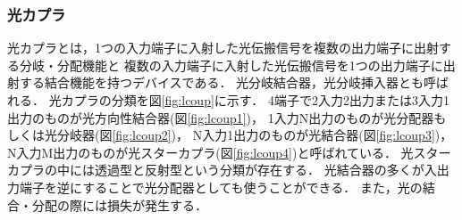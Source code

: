 \subsubsection{光カプラ}
光カプラとは，1つの入力端子に入射した光伝搬信号を複数の出力端子に出射する分岐・分配機能と
複数の入力端子に入射した光伝搬信号を1つの出力端子に出射する結合機能を持つデバイスである．
光分岐結合器，光分岐挿入器とも呼ばれる．
光カプラの分類を図\ref{fig:lcoup}に示す．
4端子で2入力2出力または3入力1出力のものが光方向性結合器(図\ref{fig:lcoup1})，
1入力N出力のものが光分配器もしくは光分岐器(図\ref{fig:lcoup2})，
N入力1出力のものが光結合器(図\ref{fig:lcoup3})，
N入力M出力のものが光スターカプラ(図\ref{fig:lcoup4})と呼ばれている．
光スターカプラの中には透過型と反射型という分類が存在する．
光結合器の多くが入出力端子を逆にすることで光分配器としても使うことができる\cite{ハンドブック}．
また，光の結合・分配の際には損失が発生する．
